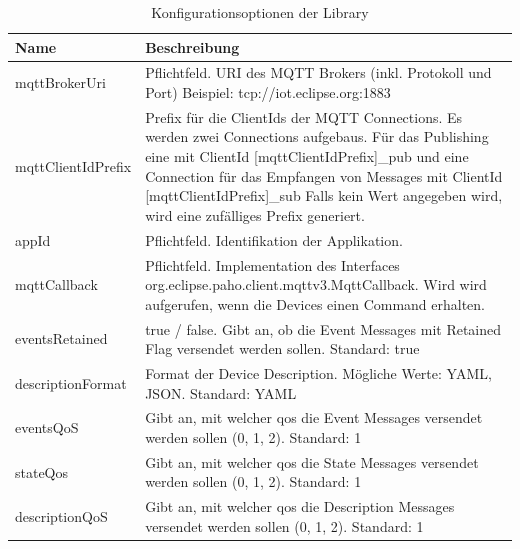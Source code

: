 \begin{table}[H]
\begin{tabularx}{\textwidth}{|l|X|}

 \hline \rowcolor{lightgray}
 {\bf Name } & {\bf Beschreibung }  \\  \hline
 
 mqttBrokerUri & Pflichtfeld. URI des MQTT Brokers (inkl. Protokoll und Port) \newline Beispiel: tcp://iot.eclipse.org:1883 \\ \hline
 
 mqttClientIdPrefix & Prefix für die ClientIds der MQTT Connections. Es werden zwei Connections aufgebaus. Für das Publishing eine mit ClientId {[mqttClientIdPrefix]}\_pub und eine Connection für das Empfangen von Messages mit ClientId {[mqttClientIdPrefix]}\_sub \newline Falls kein Wert angegeben wird, wird eine zufälliges Prefix generiert. \\ \hline
 
 appId & Pflichtfeld. Identifikation der Applikation. \\ \hline
 
 mqttCallback & Pflichtfeld. Implementation des Interfaces org.eclipse.paho.client.mqttv3.MqttCallback. Wird wird aufgerufen, wenn die Devices einen Command erhalten. \\ \hline
 eventsRetained &  true / false. Gibt an, ob die Event Messages mit Retained Flag versendet werden sollen. \newline Standard: true \\ \hline
 
 descriptionFormat & Format der Device Description. Mögliche Werte: YAML, JSON. \newline Standard: YAML \\ \hline
 
 eventsQoS & Gibt an, mit welcher \gls{qos} die Event Messages versendet werden sollen (0, 1, 2). \newline Standard: 1 \\ \hline
 
 stateQos & Gibt an, mit welcher \gls{qos} die State Messages versendet werden sollen (0, 1, 2). \newline Standard: 1 \\ \hline
 
 descriptionQoS & Gibt an, mit welcher \gls{qos} die Description Messages versendet werden sollen (0, 1, 2). \newline Standard: 1 \\ \hline
 
\end{tabularx}
\caption{Konfigurationsoptionen der Library}
\end{table}



